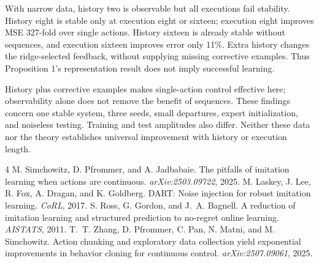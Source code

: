 \documentclass{l4dc2026}
\begin{document}
With narrow data, history two is observable but all executions fail stability. History eight is stable only at execution eight or sixteen; execution eight improves MSE 327-fold over single actions. History sixteen is already stable without sequences, and execution sixteen improves error only 11\%. Extra history changes the ridge-selected feedback, without supplying missing corrective examples. Thus Proposition 1's representation result does not imply successful learning.

History plus corrective examples makes single-action control effective here; observability alone does not remove the benefit of sequences. These findings concern one stable system, three seeds, small departures, expert initialization, and noiseless testing. Training and test amplitudes also differ. Neither these data nor the theory establishes universal improvement with history or execution length.

\footnotesize
\begin{thebibliography}{4}\setlength{\itemsep}{1pt}
 M. Simchowitz, D. Pfrommer, and A. Jadbabaie. The pitfalls of imitation learning when actions are continuous. \emph{arXiv:2503.09722}, 2025.
 M. Laskey, J. Lee, R. Fox, A. Dragan, and K. Goldberg. DART: Noise injection for robust imitation learning. \emph{CoRL}, 2017.
 S. Ross, G. Gordon, and J.~A. Bagnell. A reduction of imitation learning and structured prediction to no-regret online learning. \emph{AISTATS}, 2011.
 T.~T. Zhang, D. Pfrommer, C. Pan, N. Matni, and M. Simchowitz. Action chunking and exploratory data collection yield exponential improvements in behavior cloning for continuous control. \emph{arXiv:2507.09061}, 2025.
\end{thebibliography}
\end{document}
